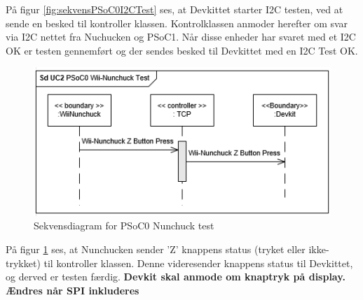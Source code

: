 På figur \ref{fig:sekvensPSoC0I2CTest} ses, at Devkittet starter I2C testen, ved at sende en besked til kontroller klassen. Kontrolklassen anmoder herefter om svar via I2C nettet fra Nuchucken og PSoC1. Når disse enheder har svaret med et I2C OK er testen gennemført og der sendes besked til Devkittet med en I2C Test OK.

\begin{figure}[H]
	\centering
	\includegraphics[width=\textwidth] {Systemarkitektur/images/SDPSoC0NunchuckTest}
	\caption{Sekvensdiagram for PSoC0 Nunchuck test}
	\label{fig:sekvensPSoC0NunchuckTest}
\end{figure}

På figur \ref{fig:sekvensPSoC0NunchuckTest} ses, at Nunchucken sender 'Z' knappens status (tryket eller ikke-trykket) til kontroller klassen. Denne videresender knappens status til Devkittet, og derved er testen færdig. \textbf{Devkit skal anmode om knaptryk på display. Ændres når SPI inkluderes}\newline


